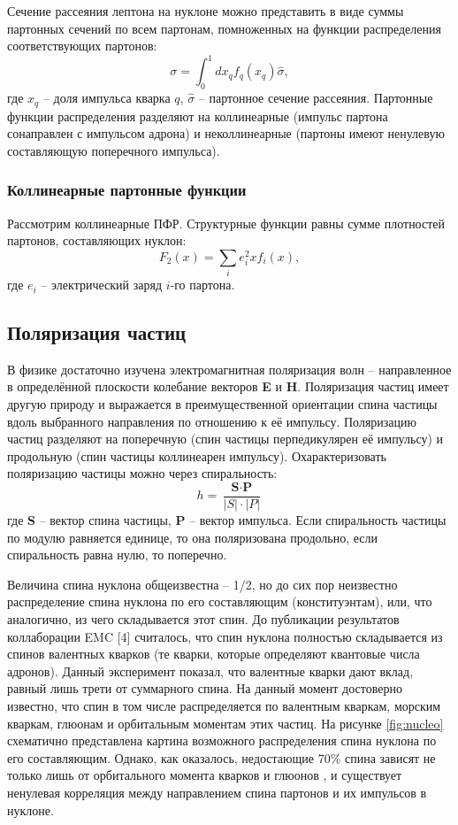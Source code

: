 \documentclass{extarticle}
\begin{document}
Сечение рассеяния лептона на нуклоне можно представить в виде суммы партонных сечений по всем партонам, помноженных на функции распределения соответствующих партонов:
\begin{equation}
	\sigma = \int_0^1 dx_q f_q(x_q) \hat{\sigma},
\end{equation}
где $x_q$ -- доля импульса кварка $q$, $\hat{\sigma}$ -- партонное сечение рассеяния.
Партонные функции распределения разделяют на коллинеарные (импульс партона сонаправлен с импульсом адрона) и неколлинеарные (партоны имеют ненулевую составляющую поперечного импульса).
\subsubsection{Коллинеарные партонные функции}
Рассмотрим коллинеарные ПФР. Структурные функции равны сумме плотностей партонов, составляющих нуклон:
\begin{equation}
F_2(x) = \sum_i e^2_i x f_i(x),
\end{equation}
где $e_i$ -- электрический заряд $i$-го партона.



\newpage
\subsection{Поляризация частиц}

 В физике достаточно изучена электромагнитная поляризация волн – направленное в определённой плоскости колебание векторов \textbf{E} и \textbf{H}. Поляризация частиц имеет другую природу и выражается в преимущественной ориентации спина частицы вдоль выбранного направления по отношению к её импульсу. Поляризацию частиц разделяют на поперечную (спин частицы перпедикулярен её импульсу) и продольную (спин частицы коллинеарен импульсу). 
 Охарактеризовать поляризацию частицы можно через спиральность:
 \begin{equation}
     h = \frac{\textbf{S} \cdot \textbf{P}}{|S|\cdot |P|}
 \end{equation}
где \textbf{S} – вектор спина частицы, \textbf{P} – вектор импульса. Если спиральность частицы по модулю равняется единице, то она поляризована продольно, если спиральность равна нулю, то поперечно. 


 Величина спина нуклона общеизвестна – 1/2, но до сих пор неизвестно распределение спина нуклона по его составляющим (конституэнтам), или, что аналогично, из чего складывается этот спин. До публикации результатов коллаборации EMC [4] считалось, что спин нуклона полностью складывается из спинов валентных кварков (те кварки, которые определяют квантовые числа адронов). Данный эксперимент показал, что валентные кварки дают вклад, равный лишь трети от суммарного спина. На данный момент достоверно известно, что спин в том числе распределяется по валентным кваркам, морским кваркам, глюонам и орбитальным моментам этих частиц. На рисунке \ref{fig:nucleo} схематично представлена картина возможного распределения спина нуклона по его составляющим.
 Однако, как оказалось, недостающие 70\% спина зависят не только лишь от орбитального момента кварков и глюонов \cite{Hagler}, и существует ненулевая корреляция между направлением спина партонов и их импульсов в нуклоне. 
\end{document}
